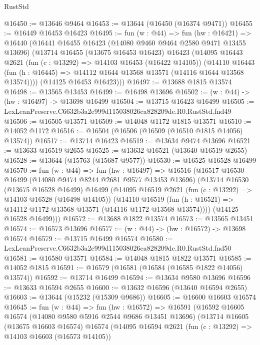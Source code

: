 \begin{lexlean}{RustStd}
\begin{coremodule}
@16450 := @13646 @9464
@16453 := @13644 (@16450 (@16374 @9471))
@16455 := @16449 @16453 @16423
@16495 := fun (w : @44) =>
  fun (hw : @16421) =>
  @16440
    (@16441
      @16455
      @16423
      (@14080 @9460 @9464 @2580 @9471 @13455 @13696)
      (@13714
        @16455
        (@13675 @16453 @16423)
        @16423
        (@14095
          @16443
          @2621
          (fun (c : @13292) => @14103 @16453 (@16422 @14105))
          (@14110
            @16443
            (fun (h : @16445) => @14112 @1644 @13568 @13571 (@14116 @1644 @13568 @13574))))
        (@14125 @16453 @16423)))
@16497 := @13688 @1815 @13574
@16498 := @13565 @13453
@16499 := @16498 @13696
@16502 := (w : @44) -> (hw : @16497) -> @13698 @16499
@16504 := @13715 @16423 @16499
@16505 := LexLeanPreserve.C6632b3a2e999d115038026ca828209de.R0.RustStd.fnd49
@16506 := @16505 @13571
@16509 := @14048 @1172 @1815 @13571
@16510 := @14052 @1172
@16516 := @16504 (@16506 (@16509 (@16510 @1815 @14056) @13574))
@16517 := @13714 @16423
@16519 := @13634 @9474 @13696
@16521 := @13633 @16519 @2655
@16525 := @13632 @16521 (@13640 @16519 @2655)
@16528 := @13644 (@15763 (@15687 @9577))
@16530 := @16525 @16528 @16499
@16570 := fun (w : @44) =>
  fun (hw : @16497) =>
  @16516
    (@16517
      @16530
      @16499
      (@14080 @9474 @8244 @2681 @9577 @13453 @13696)
      (@13714
        @16530
        (@13675 @16528 @16499)
        @16499
        (@14095
          @16519
          @2621
          (fun (c : @13292) => @14103 @16528 (@16498 @14105))
          (@14110
            @16519
            (fun (h : @16521) => @14112 @1172 @13568 @13571 (@14116 @1172 @13568 @13574))))
        (@14125 @16528 @16499)))
@16572 := @13688 @1822 @13574
@16573 := @13565 @13451
@16574 := @16573 @13696
@16577 := (w : @44) -> (hw : @16572) -> @13698 @16574
@16579 := @13715 @16499 @16574
@16580 := LexLeanPreserve.C6632b3a2e999d115038026ca828209de.R0.RustStd.fnd50
@16581 := @16580 @13571
@16584 := @14048 @1815 @1822 @13571
@16585 := @14052 @1815
@16591 := @16579 (@16581 (@16584 (@16585 @1822 @14056) @13574))
@16592 := @13714 @16499
@16594 := @13634 @9580 @13696
@16596 := @13633 @16594 @2655
@16600 := @13632 @16596 (@13640 @16594 @2655)
@16603 := @13644 (@15232 (@15309 @9686))
@16605 := @16600 @16603 @16574
@16645 := fun (w : @44) =>
  fun (hw : @16572) =>
  @16591
    (@16592
      @16605
      @16574
      (@14080 @9580 @5916 @2544 @9686 @13451 @13696)
      (@13714
        @16605
        (@13675 @16603 @16574)
        @16574
        (@14095
          @16594
          @2621
          (fun (c : @13292) => @14103 @16603 (@16573 @14105))

\end{coremodule}
\end{lexlean}
